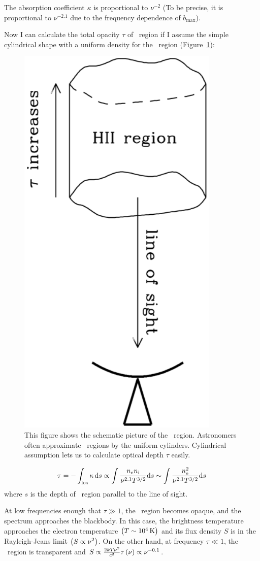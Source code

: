 The absorption coefficient $\kappa$ is proportional to $\nu^{-2}$ (To be precise, it is proportional to $\nu^{-2.1}$ due to the frequency dependence of $b_{\max}$).

Now I can calculate the total opacity $\tau$ of \ih~region if I assume the simple cylindrical shape with a uniform density for the \ih~region (Figure~\ref{fig:nrao_radio4n7}):

\begin{figure}[htbp]
	\centering
	\includegraphics[width=.3\linewidth]{Chapter_2/Figures/NRAO_radio4n7.png}
    \caption[The schematic picture of \ih~region]{\label{fig:nrao_radio4n7}
        This figure shows the schematic picture of the \ih~region.
        Astronomers often approximate \ih~regions by the uniform cylinders.
        Cylindrical assumption lets us to calculate optical depth $\tau$ easily.
    }
\end{figure}

\begin{equation}\label{eq:essential_radio4n53}
\tau=-\int_{\mathrm{los}} \kappa\,\mathrm{d} s \propto \int \frac{n_{\mathrm{e}} n_{\mathrm{i}}}{\nu^{2.1} T^{3/2}} \mathrm{d} s \sim \int \frac{n_{\mathrm{e}}^2}{\nu^{2.1} T^{3/2}} \mathrm{d} s
\end{equation}
where $s$ is the depth of \ih~region parallel to the line of sight.

At low frequencies enough that $\tau \gg 1$, the \ih~region becomes opaque, and the spectrum approaches the blackbody.
In this case, the brightness temperature approaches the electron temperature $\left(T\sim10^4\,\mathrm{K}\right)$ and its flux density $S$ is in the Rayleigh-Jeans limit $\left(S \propto \nu^2\right)$.
On the other hand, at frequency $\tau \ll 1$, the \ih~region is transparent and $S \propto \frac{2kT\nu^2}{c^2}\tau\left(\nu\right) \propto \nu^{-0.1}$.

